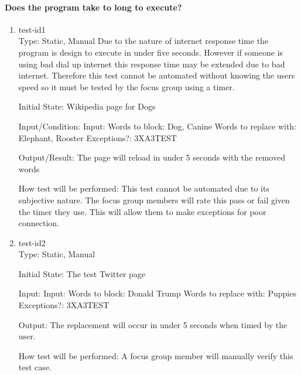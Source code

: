 \documentclass[12pt, titlepage]{article}
\begin{document}
\paragraph{Does the program take to long to execute?}
\begin{enumerate}
\item{test-id1\\}
Type: Static, Manual
 Due to the nature of internet response time the program is design to execute in under five seconds. However if someone is using bad dial up internet this response time may be extended due to bad internet. Therefore this test cannot be automated without knowing the users speed so it must be tested by the focus group using a timer.
					
Initial State: Wikipedia page for Dogs
					
Input/Condition: Input: Words to block: Dog, Canine
Words to replace with: Elephant, Rooster
Exceptions?: 3XA3TEST
					
Output/Result: The page will reload in under 5 seconds with the removed words
					
How test will be performed: This test cannot be automated due to its subjective nature. The focus group members will rate this pass or fail given the timer they use. This will allow them to make exceptions for poor connection.
					
\item{test-id2\\}
Type: Static, Manual
					
Initial State: The test Twitter page
					
Input:
Input:  Words to block: Donald Trump
Words to replace with: Puppies
Exceptions?: 3XA3TEST
					
Output: The replacement will occur in under 5 seconds when timed by the user.
					
How test will be performed: A focus group member will manually verify this test case.
\end{enumerate}
\end{document}
